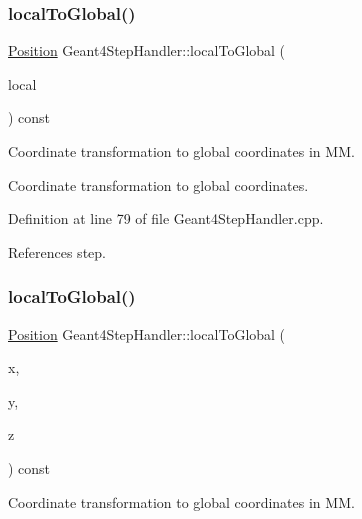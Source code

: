 \subsubsection{\texorpdfstring{local\+To\+Global()}{localToGlobal()}\hspace{0.1cm}{\footnotesize\ttfamily [3/4]}}
{\footnotesize\ttfamily \hyperlink{namespace_d_d4hep_1_1_geometry_a55083902099d03506c6db01b80404900}{Position} Geant4\+Step\+Handler\+::local\+To\+Global (\begin{DoxyParamCaption}\item[{const G4\+Three\+Vector \&}]{local }\end{DoxyParamCaption}) const}



Coordinate transformation to global coordinates in MM. 

Coordinate transformation to global coordinates. 

Definition at line 79 of file Geant4\+Step\+Handler.\+cpp.



References step.

\hypertarget{class_d_d4hep_1_1_simulation_1_1_geant4_step_handler_a8010afaef177a2734e709daa23e724c9}{}\label{class_d_d4hep_1_1_simulation_1_1_geant4_step_handler_a8010afaef177a2734e709daa23e724c9} 
\subsubsection{\texorpdfstring{local\+To\+Global()}{localToGlobal()}\hspace{0.1cm}{\footnotesize\ttfamily [4/4]}}
{\footnotesize\ttfamily \hyperlink{namespace_d_d4hep_1_1_geometry_a55083902099d03506c6db01b80404900}{Position} Geant4\+Step\+Handler\+::local\+To\+Global (\begin{DoxyParamCaption}\item[{double}]{x,  }\item[{double}]{y,  }\item[{double}]{z }\end{DoxyParamCaption}) const}



Coordinate transformation to global coordinates in MM. 


